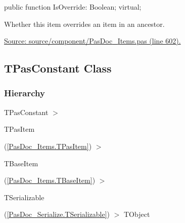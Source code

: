 \documentclass{report}
\newif\ifpdf
\begin{document}
\label{PasDoc_Items.TPasItem-IsOverride}
\begin{list}{}{
\setlength{\itemindent}{0cm}
\setlength{\listparindent}{0cm}
\setlength{\leftmargin}{\evensidemargin}
\addtolength{\leftmargin}{\tmplength}
\settowidth{\labelsep}{X}
\addtolength{\leftmargin}{\labelsep}
\setlength{\labelwidth}{\tmplength}
}
\item[\textbf{Declaration}\hfill]
\ifpdf
\begin{flushleft}
\fi
\begin{ttfamily}
public function IsOverride: Boolean; virtual;\end{ttfamily}

\ifpdf
\end{flushleft}
\fi

\par
\item[\textbf{Description}]
Whether this item overrides an item in an ancestor.\par
\href{https://github.com/pasdoc/pasdoc/blob/master/source/component/PasDoc_Items.pas#L602}{Source: source/component/PasDoc{\_}Items.pas (line 602).}

\end{list}
\ifpdf
\subsection*{\large{\textbf{TPasConstant Class}}\normalsize\hspace{1ex}\hrulefill}
\else
\subsection*{TPasConstant Class}
\fi
\label{PasDoc_Items.TPasConstant}
\subsubsection*{\large{\textbf{Hierarchy}}\normalsize\hspace{1ex}\hfill}
TPasConstant {$>$} \begin{ttfamily}TPasItem\end{ttfamily}(\ref{PasDoc_Items.TPasItem}) {$>$} \begin{ttfamily}TBaseItem\end{ttfamily}(\ref{PasDoc_Items.TBaseItem}) {$>$} \begin{ttfamily}TSerializable\end{ttfamily}(\ref{PasDoc_Serialize.TSerializable}) {$>$} 
TObject
\end{document}
